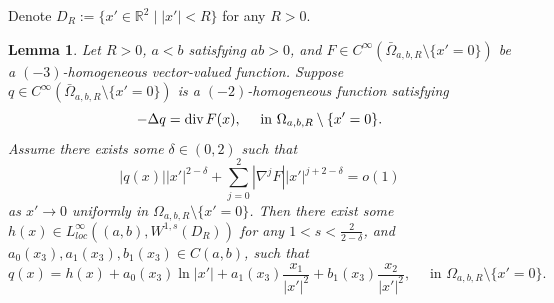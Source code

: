\documentclass[12pt]{article}
\newtheorem{lem}{Lemma}[section]
\newcommand{\dive}{{\rm div \hspace{0.05cm} }}
\begin{document}
Denote $D_R:=\{x'\in\mathbb{R}^2 \mid |x'|<R\}$ for any $R>0$. 

\begin{lem}\label{lem:2_2}
	Let $R>0$, 
	$a<b$ satisfying $ab>0$,
	and $F\in C^{\infty}(\bar{\Omega}_{a, b, R}\setminus\{x'=0\})$ be a $(-3)$-homogeneous vector-valued function.
	Suppose $q\in C^{\infty}(\bar{\Omega}_{a, b, R}\setminus\{x'=0\})$ is a $(-2)$-homogeneous function satisfying 
	\begin{equation*}
		-\Delta q=\dive F(x), 
		\quad \textrm{ in }\Omega_{a, b, R}\setminus\{x'=0\}. 
	\end{equation*}
	Assume there exists some $\delta\in (0, 2)$ such that 
	\begin{equation}\label{eq:lem:2_2:1}
		|q(x)| |x'|^{2-\delta}+\sum_{j=0}^{2}|\nabla^jF| |x'|^{j+2-\delta}=o(1)
	\end{equation}
	as $x'\to 0$ uniformly in $\Omega_{a, b, R}\setminus\{x'=0\}$. Then there exist some $h(x) \in L^{\infty}_{loc}((a, b), W^{1, s}(D_R))$ for any $1< s<\frac{2}{2-\delta}$, and $a_0(x_3), a_1(x_3), b_1(x_3)\in C(a, b)$, such that 
	\begin{equation}\label{eq:lem:2_2:2}
		q(x)=h(x)+a_0(x_3)\ln |x'|+a_1(x_3)\frac{x_1}{|x'|^2}+b_1(x_3)\frac{x_2}{|x'|^2}, \quad \textrm{ in }\Omega_{a, b, R}\setminus\{x'=0\}.
	\end{equation}
\end{lem}
\end{document}
